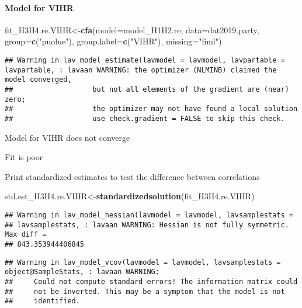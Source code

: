 \documentclass[
]{article}
\newenvironment{Shaded}{\begin{snugshade}}{\end{snugshade}}
\newcommand{\DataTypeTok}[1]{\textcolor[rgb]{0.13,0.29,0.53}{#1}}
\newcommand{\KeywordTok}[1]{\textcolor[rgb]{0.13,0.29,0.53}{\textbf{#1}}}
\newcommand{\NormalTok}[1]{#1}
\newcommand{\StringTok}[1]{\textcolor[rgb]{0.31,0.60,0.02}{#1}}
\begin{document}
\newpage

\hypertarget{model-for-vihr}{%
\paragraph{Model for VIHR}\label{model-for-vihr}}

\begin{Shaded}
\begin{Highlighting}[]
\NormalTok{fit_H3H4.re.VIHR<-}\KeywordTok{cfa}\NormalTok{(}\DataTypeTok{model=}\NormalTok{model_H1H2.re,}
                    \DataTypeTok{data=}\NormalTok{dat2019.party,}
                    \DataTypeTok{group=}\KeywordTok{c}\NormalTok{(}\StringTok{"puolue"}\NormalTok{),}
                    \DataTypeTok{group.label=}\KeywordTok{c}\NormalTok{(}\StringTok{"VIHR"}\NormalTok{),}
                    \DataTypeTok{missing=}\StringTok{"fiml"}\NormalTok{)}
\end{Highlighting}
\end{Shaded}

\begin{verbatim}
## Warning in lav_model_estimate(lavmodel = lavmodel, lavpartable = lavpartable, : lavaan WARNING: the optimizer (NLMINB) claimed the model converged,
##                   but not all elements of the gradient are (near) zero;
##                   the optimizer may not have found a local solution
##                   use check.gradient = FALSE to skip this check.
\end{verbatim}

Model for VIHR does not converge

Fit is poor

Print standardized estimates to test the difference between correlations

\begin{Shaded}
\begin{Highlighting}[]
\NormalTok{std.est_H3H4.re.VIHR<-}\KeywordTok{standardizedsolution}\NormalTok{(fit_H3H4.re.VIHR)}
\end{Highlighting}
\end{Shaded}

\begin{verbatim}
## Warning in lav_model_hessian(lavmodel = lavmodel, lavsamplestats =
## lavsamplestats, : lavaan WARNING: Hessian is not fully symmetric. Max diff =
## 843.353944406845
\end{verbatim}

\begin{verbatim}
## Warning in lav_model_vcov(lavmodel = lavmodel, lavsamplestats = object@SampleStats, : lavaan WARNING:
##     Could not compute standard errors! The information matrix could
##     not be inverted. This may be a symptom that the model is not
##     identified.
\end{verbatim}
\end{document}
